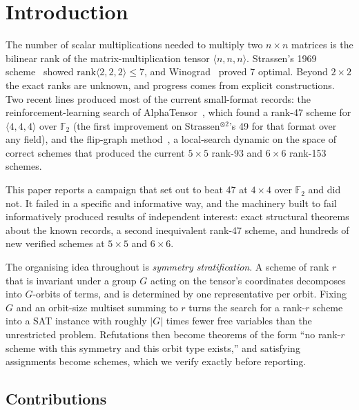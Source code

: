 \documentclass[11pt]{article}
\newcommand{\FF}{\mathbb{F}_2}
\newcommand{\tw}[3]{\langle #1,#2,#3\rangle}
\begin{document}
\section{Introduction}

The number of scalar multiplications needed to multiply two $n\times n$ matrices is the bilinear rank of
the matrix-multiplication tensor $\tw nnn$. Strassen's 1969 scheme~\cite{Strassen1969} showed
$\mathrm{rank}\tw222 \leq 7$, and Winograd~\cite{Winograd1971} proved 7 optimal. Beyond $2\times2$ the
exact ranks are unknown, and progress comes from explicit constructions. Two recent lines produced most
of the current small-format records: the reinforcement-learning search of AlphaTensor~\cite{Fawzi2022},
which found a rank-47 scheme for $\tw444$ over $\FF$ (the first improvement on
Strassen$^{\otimes2}$'s 49 for that format over any field), and the flip-graph
method~\cite{Kauers2022,Arai2024,Moosbauer2025}, a local-search dynamic on the space of
correct schemes that produced the current $5\times5$ rank-93 and $6\times6$ rank-153 schemes.

This paper reports a campaign that set out to beat 47 at $4\times4$ over $\FF$ and did not. It failed in a
specific and informative way, and the machinery built to fail informatively produced results of
independent interest: exact structural theorems about the known records, a second inequivalent rank-47
scheme, and hundreds of new verified schemes at $5\times5$ and $6\times6$.

The organising idea throughout is \emph{symmetry stratification}. A scheme of rank $r$ that is invariant
under a group $G$ acting on the tensor's coordinates decomposes into $G$-orbits of terms, and is
determined by one representative per orbit. Fixing $G$ and an orbit-size multiset summing to $r$ turns
the search for a rank-$r$ scheme into a SAT instance with roughly $|G|$ times fewer free variables than
the unrestricted problem. Refutations then become theorems of the form ``no rank-$r$ scheme with this
symmetry and this orbit type exists,'' and satisfying assignments become schemes, which we verify
exactly before reporting.

\subsection{Contributions}
\end{document}
